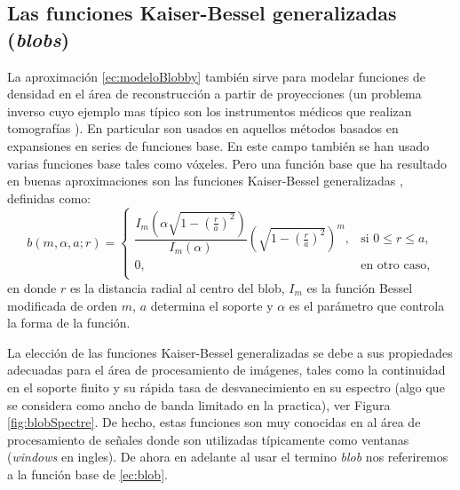 \subsection{Las funciones Kaiser-Bessel generalizadas (\textit{blobs})}

La aproximación \eqref{ec:modeloBlobby} también sirve para modelar funciones de densidad en el área de reconstrucción a partir de proyecciones (un problema inverso cuyo ejemplo mas típico son los instrumentos médicos que realizan tomografías \cite{tomografyBook}). En particular son usados en aquellos métodos basados en expansiones en series de funciones base. En este campo también se han usado varias funciones base tales como vóxeles. Pero una función base que ha resultado en buenas aproximaciones son las funciones Kaiser-Bessel generalizadas \cite{BlobsMate}, definidas como:
\begin{equation}
\label{ec:blob}
 b(m, \alpha, a; r) = \begin{cases}
            \dfrac{ I_m \left(  \alpha \sqrt{1 - \left( \frac{r}{a} \right) ^2 }  \right) } {I_m(\alpha)} \left( \sqrt{1 - \left( \frac{r}{a} \right) ^2 }  \right)^m, & \text{si $0 \leq r \leq a$,} \\
                    0, & \text{en otro caso,} \\
            \end{cases}
\end{equation}
en donde $r$ es la distancia radial al centro del blob, $I_m$ es la función Bessel modificada de orden $m$, $a$ determina el soporte y $\alpha$ es el parámetro que controla la forma de la función. 

La elección de las funciones Kaiser-Bessel generalizadas se debe a sus propiedades adecuadas para el área de procesamiento de imágenes, tales como la continuidad en el soporte finito y su rápida tasa de desvanecimiento en su espectro (algo que se considera como ancho de banda limitado en la practica), ver Figura \ref{fig:blobSpectre}. De hecho, estas funciones son muy conocidas en al área de procesamiento de señales donde son utilizadas típicamente como ventanas (\emph{windows} en ingles). De ahora en adelante al usar el termino \emph{blob} nos referiremos a la función base de \eqref{ec:blob}.


